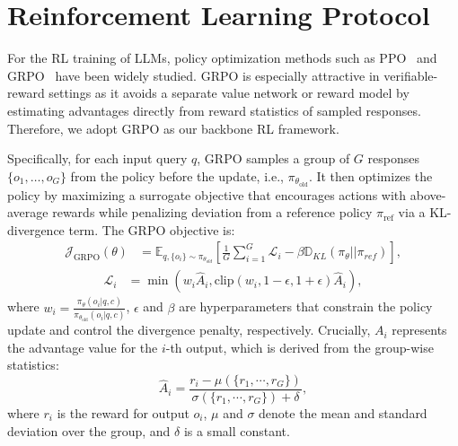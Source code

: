 \documentclass{article} %
\begin{document}
\section{Reinforcement Learning Protocol}
\label{app:GRPO}

For the RL training of LLMs, policy optimization methods such as PPO~\citep{ppo} and GRPO~\citep{DeepSeekMath} have been widely studied. 
GRPO is especially attractive in verifiable-reward settings as it avoids a separate value network or reward model by estimating advantages directly from reward statistics of sampled responses. 
Therefore, we adopt GRPO as our backbone RL framework.

Specifically, for each input query $q$, GRPO samples a group of $G$ responses $\{o_1, \dots, o_G\}$ from the policy before the update, i.e., $\pi_{\theta_{\text{old}}}$. It then optimizes the policy by maximizing a surrogate objective that encourages actions with above-average rewards while penalizing deviation from a reference policy $\pi_{\text{ref}}$ via a KL-divergence term. 
The GRPO objective is:
\begin{equation}		
\label{grpo_1}
		\begin{aligned}
            \mathcal{J}_\text{GRPO}(\theta) &= \mathbb{E}_{q, \{o_i\} \sim \pi_{\theta_{old}}} \left[ \frac{1}{G} \sum_{i=1}^G \mathcal{L}_i - \beta \mathbb{D}_{KL}(\pi_{\theta} || \pi_{ref}) \right],
		\end{aligned}
\end{equation}
\begin{equation}		
\label{grpo_2}
		\begin{aligned}
            \mathcal{L}_i &= \min \left( w_i \hat{A}_i, \text{clip}(w_i, 1 - \epsilon, 1 + \epsilon) \hat{A}_i \right),
		\end{aligned}
\end{equation}
where $w_i = \frac{\pi_{\theta}(o_i|q, c)}{\pi_{\theta_{\text{old}}}(o_i|q, c)}$, $\epsilon$ and $\beta$ are hyperparameters that constrain the policy update and control the divergence penalty, respectively.
Crucially, $A_i$ represents the advantage value for the $i$-th output, which is derived from the group-wise statistics:
\begin{equation}
\label{eq:advantage}
\hat{A}_i = \frac{r_i - \mu(\{r_1, \cdots, r_G\})}{\sigma(\{r_1, \cdots, r_G\}) + \delta},
\end{equation}
where $r_i$ is the reward for output $o_i$, $\mu$ and $\sigma$ denote the mean and standard deviation over the group, and $\delta$ is a small constant. 
\end{document}
